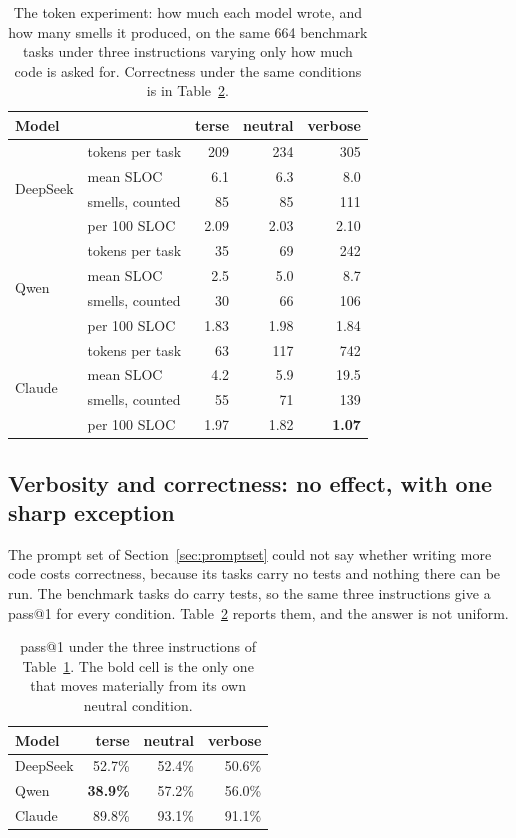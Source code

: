 \documentclass[10pt,a4paper,twocolumn]{article}
\begin{document}
\begin{table}[H]
  \centering
  \small
  \setlength{\tabcolsep}{4pt}
  \begin{tabular}{llrrr}
  \toprule
  Model & & terse & neutral & verbose \\
  \midrule
  \multirow{4}{*}{DeepSeek}
    & tokens per task  &  209 &  234 &  305 \\
    & mean SLOC        &  6.1 &  6.3 &  8.0 \\
    & smells, counted &   85 &   85 &  111 \\
    & per 100 SLOC     & 2.09 & 2.03 & 2.10 \\
  \midrule
  \multirow{4}{*}{Qwen}
    & tokens per task  &   35 &   69 &  242 \\
    & mean SLOC        &  2.5 &  5.0 &  8.7 \\
    & smells, counted &   30 &   66 &  106 \\
    & per 100 SLOC     & 1.83 & 1.98 & 1.84 \\
  \midrule
  \multirow{4}{*}{Claude}
    & tokens per task  &   63 &  117 &  742 \\
    & mean SLOC        &  4.2 &  5.9 & 19.5 \\
    & smells, counted &   55 &   71 &  139 \\
    & per 100 SLOC     & 1.97 & 1.82 & \textbf{1.07} \\
  \bottomrule
  \end{tabular}
  \caption{The token experiment: how much each model wrote, and how many smells
  it produced, on the same 664 benchmark tasks under three instructions varying
  only how much code is asked for. Correctness under the same conditions is in
  Table~\ref{tab:tokenspass}.}
  \label{tab:tokens}
\end{table}

\subsection{Verbosity and correctness: no effect, with one sharp exception}

The prompt set of Section~\ref{sec:promptset} could not say whether writing more
code costs correctness, because its tasks carry no tests and nothing there can be
run. The benchmark tasks do carry tests, so the same three instructions give a
pass@1 for every condition. Table~\ref{tab:tokenspass} reports them, and the
answer is not uniform.

\begin{table}[H]
  \centering
  \small
  \begin{tabular}{lrrr}
  \toprule
  Model & terse & neutral & verbose \\
  \midrule
  DeepSeek & 52.7\% & 52.4\% & 50.6\% \\
  Qwen     & \textbf{38.9\%} & 57.2\% & 56.0\% \\
  Claude   & 89.8\% & 93.1\% & 91.1\% \\
  \bottomrule
  \end{tabular}
  \caption{pass@1 under the three instructions of Table~\ref{tab:tokens}. The
  bold cell is the only one that moves materially from its own neutral condition.}
  \label{tab:tokenspass}
\end{table}
\end{document}
